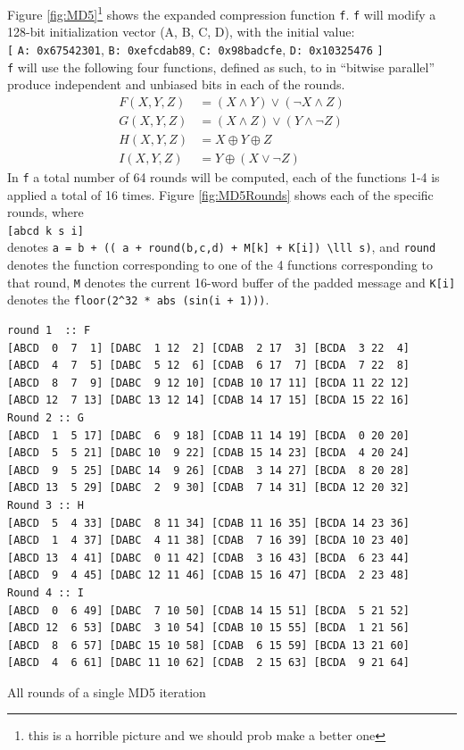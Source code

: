 \documentclass[a4paper, openany]{book}
\begin{document}
Figure \ref{fig:MD5}\footnote{this is a horrible picture and we should prob make a better one} shows the expanded compression function \texttt{f}. \texttt{f} will modify a 128-bit initialization vector (A, B, C, D), with the initial value:\\
\texttt{[} \texttt{A: 0x67542301}, \texttt{B: 0xefcdab89}, \texttt{C: 0x98badcfe}, \texttt{D: 0x10325476} \texttt{]}\\
\texttt{f} will use the following four functions, defined as such, to in ``bitwise parallel'' produce independent and unbiased bits in each of the rounds.
\begin{align}
F(X, Y, Z) &= (X \wedge Y) \vee (\neg X \wedge Z) \\
G(X, Y, Z) &= (X \wedge Z) \vee (Y \wedge \neg Z) \\
H(X, Y, Z) &= X \oplus Y \oplus Z \\
I(X, Y, Z) &= Y \oplus ( X \vee \neg Z)
\end{align}
In \texttt{f} a total number of 64 rounds will be computed, each of the functions 1-4 is applied a total of 16 times. Figure \ref{fig:MD5Rounds} shows each of the specific rounds, where\\
\texttt{[abcd k s i]}\\
denotes \texttt{a = b + (( a + round(b,c,d) + M[k] + K[i]) \textbackslash{}lll s)}, and \texttt{round} denotes the function corresponding to one of the 4 functions corresponding to that round, \texttt{M} denotes the current 16-word buffer of the padded message and \texttt{K[i]} denotes the \texttt{floor(2\textasciicircum{}32 * abs (sin(i + 1)))}.
\begin{table}[!htb]
\centering
\begin{verbatim}
round 1  :: F
[ABCD  0  7  1] [DABC  1 12  2] [CDAB  2 17  3] [BCDA  3 22  4]
[ABCD  4  7  5] [DABC  5 12  6] [CDAB  6 17  7] [BCDA  7 22  8]
[ABCD  8  7  9] [DABC  9 12 10] [CDAB 10 17 11] [BCDA 11 22 12]
[ABCD 12  7 13] [DABC 13 12 14] [CDAB 14 17 15] [BCDA 15 22 16]
Round 2 :: G
[ABCD  1  5 17] [DABC  6  9 18] [CDAB 11 14 19] [BCDA  0 20 20]
[ABCD  5  5 21] [DABC 10  9 22] [CDAB 15 14 23] [BCDA  4 20 24]
[ABCD  9  5 25] [DABC 14  9 26] [CDAB  3 14 27] [BCDA  8 20 28]
[ABCD 13  5 29] [DABC  2  9 30] [CDAB  7 14 31] [BCDA 12 20 32]
Round 3 :: H
[ABCD  5  4 33] [DABC  8 11 34] [CDAB 11 16 35] [BCDA 14 23 36]
[ABCD  1  4 37] [DABC  4 11 38] [CDAB  7 16 39] [BCDA 10 23 40]
[ABCD 13  4 41] [DABC  0 11 42] [CDAB  3 16 43] [BCDA  6 23 44]
[ABCD  9  4 45] [DABC 12 11 46] [CDAB 15 16 47] [BCDA  2 23 48]
Round 4 :: I
[ABCD  0  6 49] [DABC  7 10 50] [CDAB 14 15 51] [BCDA  5 21 52]
[ABCD 12  6 53] [DABC  3 10 54] [CDAB 10 15 55] [BCDA  1 21 56]
[ABCD  8  6 57] [DABC 15 10 58] [CDAB  6 15 59] [BCDA 13 21 60]
[ABCD  4  6 61] [DABC 11 10 62] [CDAB  2 15 63] [BCDA  9 21 64]
\end{verbatim}
\caption{All rounds of a single MD5 iteration}
\label{fig:MD5Rounds}
\end{table}
\end{document}

